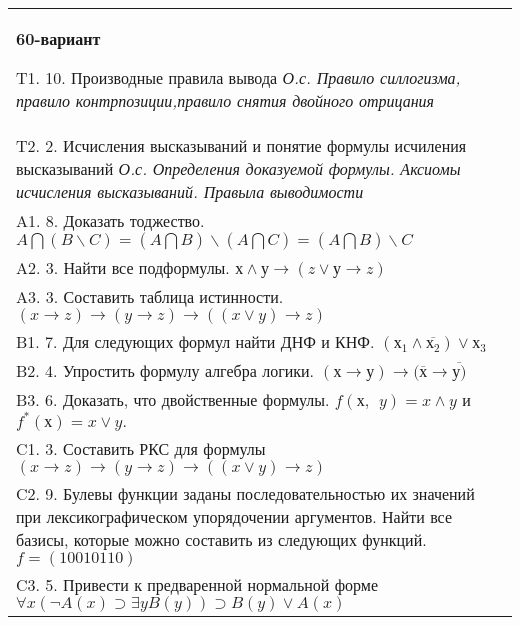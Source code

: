 \documentclass{article}
\begin{document}
\begin{tabular}{m{17cm}}
\textbf{60-вариант}
\newline

T1. 10. Производные правила вывода \emph{О.с. Правило силлогизма, правило контрпозиции,правило снятия двойного отрицания} \\
T2. 2. Исчисления высказываний и понятие формулы исчиления высказываний \emph{О.с. Определения доказуемой формулы. Аксиомы исчисления высказываний. Правыла выводимости} \\
A1. 8. Доказать тоджество. \(A\bigcap(B\backslash C) = (A\bigcap B)\backslash(A\bigcap C) = (A\bigcap B)\backslash C\) \\
A2. 3. Найти все подформулы. \(х \land у \rightarrow (z \vee у \rightarrow z)\) \\
A3. 3. Составить таблица истинности. \((x \rightarrow z) \rightarrow (y \rightarrow z) \rightarrow ((x \vee y) \rightarrow z)\) \\
B1. 7. Для следующих формул найти ДНФ и КНФ. \(\left( х_{1} \land \overline{х_{2}} \right) \vee х_{3}\) \\
B2. 4. Упростить формулу алгебра логики. \((х \rightarrow у) \rightarrow (\overline{х} \rightarrow \overline{у)}\) \\
B3. 6. Доказать, что двойственные формулы. \(f(х,\ \ y) = x \land y\) и \(f^{*}(х) = x \vee y.\) \\
C1. 3. Составить РКС для формулы \((x \rightarrow z) \rightarrow (y \rightarrow z) \rightarrow ((x \vee y) \rightarrow z)\) \\
C2. 9. Булевы функции заданы последовательностью их значений при лексикографическом упорядочении аргументов. Найти все базисы, которые можно составить из следующих функций. \(f = (10010110)\) \\
C3. 5. Привести к предваренной нормальной форме \(\forall x(\neg A(x) \supset \exists yB(y)) \supset B(y) \vee A(x)\) \\

\end{tabular}
\vspace{1cm}
\end{document}
